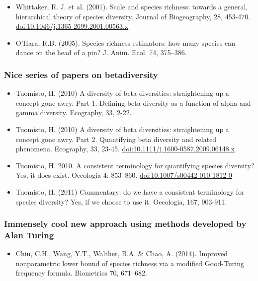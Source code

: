 \documentclass[]{book}
\providecommand{\tightlist}{%
  \setlength{\itemsep}{0pt}\setlength{\parskip}{0pt}}
\theoremstyle{definition}
\theoremstyle{definition}
\theoremstyle{definition}
\theoremstyle{remark}
\begin{document}
\begin{itemize}
\tightlist
\item
  Whittaker, R. J. et al. (2001). Scale and species richness: towards a
  general, hierarchical theory of species diversity. Journal of
  Biogeography, 28, 453-470. \url{doi:10.1046/j.1365-2699.2001.00563.x}
\item
  O'Hara, R.B. (2005). Species richness estimators: how many species can
  dance on the head of a pin? J. Anim. Ecol. 74, 375--386.
\end{itemize}

\subsubsection{Nice series of papers on
betadiversity}\label{nice-series-of-papers-on-betadiversity}

\begin{itemize}
\tightlist
\item
  Tuomisto, H. (2010) A diversity of beta diversities: straightening up
  a concept gone awry. Part 1. Defining beta diversity as a function of
  alpha and gamma diversity. Ecography, 33, 2-22.
\item
  Tuomisto, H. (2010) A diversity of beta diversities: straightening up
  a concept gone awry. Part 2. Quantifying beta diversity and related
  phenomena. Ecography, 33, 23-45.
  \url{doi:10.1111/j.1600-0587.2009.06148.x}
\item
  Tuomisto, H. 2010. A consistent terminology for quantifying species
  diversity? Yes, it does exist. Oecologia 4: 853--860.
  \url{doi:10.1007/s00442-010-1812-0}
\item
  Tuomisto, H. (2011) Commentary: do we have a consistent terminology
  for species diversity? Yes, if we choose to use it. Oecologia, 167,
  903-911.
\end{itemize}

\subsubsection{Immensely cool new approach using methods developed by
Alan
Turing}\label{immensely-cool-new-approach-using-methods-developed-by-alan-turing}

\begin{itemize}
\tightlist
\item
  Chiu, C.H., Wang, Y.T., Walther, B.A. \& Chao, A. (2014). Improved
  nonparametric lower bound of species richness via a modified
  Good-Turing frequency formula. Biometrics 70, 671--682.
\end{itemize}
\end{document}
